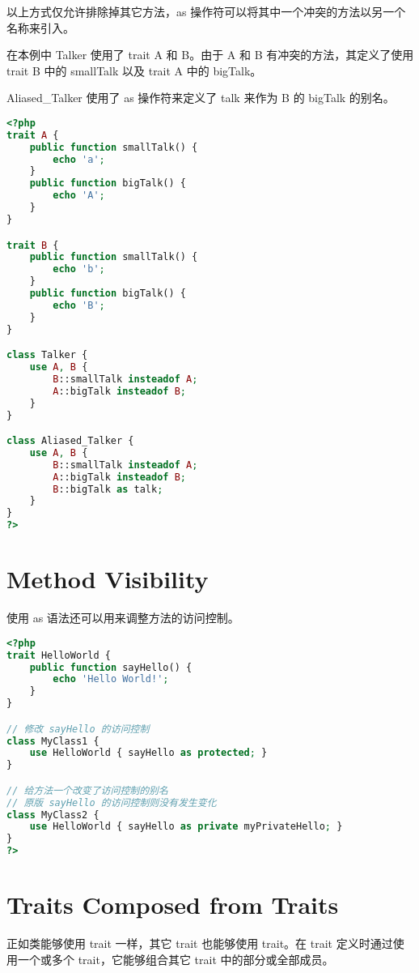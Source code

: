 以上方式仅允许排除掉其它方法，as 操作符可以将其中一个冲突的方法以另一个名称来引入。

在本例中 Talker 使用了 trait A 和 B。由于 A 和 B 有冲突的方法，其定义了使用 trait B 中的 smallTalk 以及 trait A 中的 bigTalk。

Aliased\_Talker 使用了 as 操作符来定义了 talk 来作为 B 的 bigTalk 的别名。

\begin{lstlisting}[language=PHP]
<?php
trait A {
    public function smallTalk() {
        echo 'a';
    }
    public function bigTalk() {
        echo 'A';
    }
}

trait B {
    public function smallTalk() {
        echo 'b';
    }
    public function bigTalk() {
        echo 'B';
    }
}

class Talker {
    use A, B {
        B::smallTalk insteadof A;
        A::bigTalk insteadof B;
    }
}

class Aliased_Talker {
    use A, B {
        B::smallTalk insteadof A;
        A::bigTalk insteadof B;
        B::bigTalk as talk;
    }
}
?>
\end{lstlisting}




\section{Method Visibility}

使用 as 语法还可以用来调整方法的访问控制。

\begin{lstlisting}[language=PHP]
<?php
trait HelloWorld {
    public function sayHello() {
        echo 'Hello World!';
    }
}

// 修改 sayHello 的访问控制
class MyClass1 {
    use HelloWorld { sayHello as protected; }
}

// 给方法一个改变了访问控制的别名
// 原版 sayHello 的访问控制则没有发生变化
class MyClass2 {
    use HelloWorld { sayHello as private myPrivateHello; }
}
?>
\end{lstlisting}




\section{Traits Composed from Traits}

正如类能够使用 trait 一样，其它 trait 也能够使用 trait。在 trait 定义时通过使用一个或多个 trait，它能够组合其它 trait 中的部分或全部成员。

